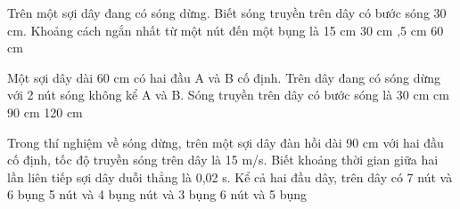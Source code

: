 \begin{vidu}%
 Trên một sợi dây đang có sóng dừng. Biết sóng truyền trên dây có bước sóng 30 cm. Khoảng cách ngắn nhất từ một nút đến một bụng là
\choice
{15 cm}
{30 cm}
{,5 cm}
{60 cm}
\end{vidu} %
\begin{vidu}%
 Một sợi dây dài 60 cm có hai đầu A và B cố định. Trên dây đang có sóng dừng với 2 nút sóng không kể A và B. Sóng truyền trên dây có bước sóng là
\choice
{30 cm}
{ cm}
{90 cm}
{120 cm}
\end{vidu} %
\begin{vidu}%
Trong thí nghiệm về sóng dừng, trên một sợi dây đàn hồi dài 90 cm với hai đầu cố định, tốc độ truyền sóng trên dây là 15 m/s. Biết khoảng thời gian giữa hai lần liên tiếp sợi dây duỗi thẳng là 0,02 s. Kể cả hai đầu dây, trên dây có
\choice
{7 nút và 6 bụng}
{5 nút và 4 bụng}
{ nút và 3 bụng}
{6 nút và 5 bụng}
\end{vidu} %

